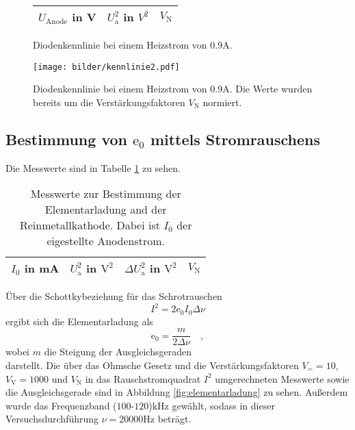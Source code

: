 	
	\begin{figure}[htbp]
	\begin{minipage}{0.3\textwidth} 
			\centering
			\begin{tabular}{ccc}
				\toprule \midrule
				$U_\text{Anode}$ in V & $U_\text{a}^2$ in $V^2$ 
				& $V_\text{N}$\\
				\midrule
							
				\midrule \bottomrule
			\end{tabular}
			\caption{Diodenkennlinie bei einem Heizstrom von 
			$0.9$A.}
			\label{tab:kennlinie2}
	\end{minipage}
	\hfill
	\begin{minipage}{0.7\textwidth}
			\centering
			\texttt{[image: bilder/kennlinie2.pdf]}
			\caption{Diodenkennlinie bei einem Heizstrom von 
			$0.9$A. Die Werte wurden bereits um die 
			Verstärkungsfaktoren $V_\text{N}$ normiert.}
			\label{fig:kennlinie2}		
	\end{minipage}
	\end{figure}		
	
	
	
\clearpage
\subsection{Bestimmung von $\text{e}_0$ mittels Stromrauschens}

	Die Messwerte sind in Tabelle \ref{tab:elementarladung_messwerte} 
	zu sehen.
	\begin{table}[h]
	\centering
		\begin{tabular}{cccc}
		\toprule 
		\midrule
			$I_0$ in mA & $U^2_\text{a}$ in $\text{V}^2$ &
			$\Delta U_\text{a}^2$ in $\text{V}^2$ & $V_\text{N}$ \\
			\midrule
			
			\midrule 
			\bottomrule
		\end{tabular}
		\caption{Messwerte zur Bestimmung der Elementarladung 
		and der Reinmetallkathode. Dabei ist $I_0$ der eigestellte 
		Anodenstrom.}
		\label{tab:elementarladung_messwerte}
	\end{table}
	
	Über die Schottkybeziehung für das Schrotrauschen 
	\begin{equation}
		I^2 = 2 \text{e}_0 I_0 \Delta \nu
	\end{equation}		
	ergibt sich die Elementarladung als 
	\begin{equation}
	\text{e}_0 = \frac{m}{2 \Delta \nu} \quad ,
	\end{equation}
	wobei $m$ die Steigung der Ausgleichsgeraden 
	\begin{equation}
	
	\end{equation}
	darstellt. Die über das Ohmsche Gesetz und die 
	Verstärkungsfaktoren $V_= =10$, $V_\text{V}=1000$ und 
	$V_\text{N}$ in das Rauschstromquadrat $I^2$ umgerechneten 
	Messwerte sowie die Ausgleichsgerade sind in Abbildung 
	\ref{fig:elementarladung} zu sehen. Außerdem wurde das 
	Frequenzband ($100$-$120$)kHz gewählt, sodass in dieser 
	Versuchsdurchführung $\nu = 20000$Hz beträgt.
		
